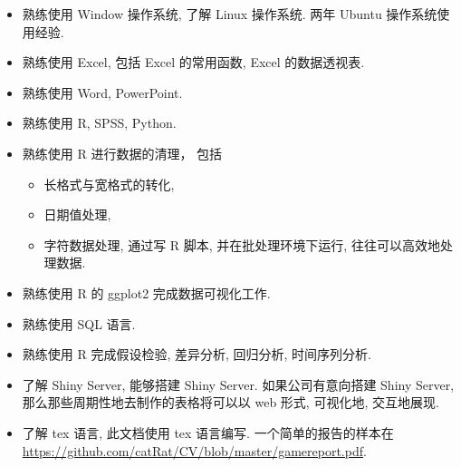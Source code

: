 \begin{itemize}
\item 熟练使用 Window 操作系统, 了解 Linux 操作系统. 两年 Ubuntu 操作系统使用经验.
\item 熟练使用 Excel, 包括 Excel 的常用函数, Excel 的数据透视表.
\item 熟练使用 Word, PowerPoint.
\item 熟练使用 R, SPSS, Python.
\item 熟练使用 R 进行数据的清理， 包括
\begin{itemize}
\item 长格式与宽格式的转化,
\item 日期值处理,
\item 字符数据处理,
\newline\noindent 通过写 R 脚本, 并在批处理环境下运行, 往往可以高效地处理数据.
\end{itemize}
\item 熟练使用 R 的 ggplot2 完成数据可视化工作.
\item 熟练使用 SQL 语言.
\item 熟练使用 R 完成假设检验, 差异分析, 回归分析, 时间序列分析.
\item 了解 Shiny Server, 能够搭建 Shiny Server. 如果公司有意向搭建 Shiny Server, 那么那些周期性地去制作的表格将可以以 web 形式, 可视化地, 交互地展现.
\item 了解 tex 语言, 此文档使用 tex 语言编写. 一个简单的报告的样本在 \url{https://github.com/catRat/CV/blob/master/gamereport.pdf}.
\end{itemize}
